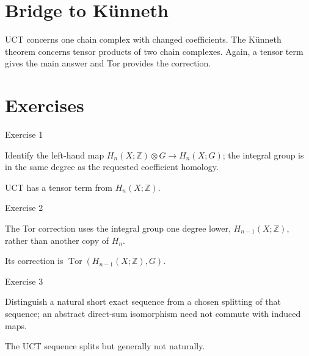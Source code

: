 \section{Bridge to Künneth}
UCT concerns one chain complex with changed coefficients.  The Künneth theorem
concerns tensor products of two chain complexes.  Again, a tensor term gives the
main answer and Tor provides the correction.


\section{Exercises}

\begin{exercise}\label{exr:viii26-01}
Exercise 1
\end{exercise}
\begin{hint}
Identify the left-hand map \(H_n(X;\mathbb Z)\otimes G\to H_n(X;G)\); the integral group is in the same degree as the requested coefficient homology.
\end{hint}
\begin{solution}
UCT has a tensor term from \(H_n(X;\mathbb Z)\).
\end{solution}

\begin{exercise}\label{exr:viii26-02}
Exercise 2
\end{exercise}
\begin{hint}
The Tor correction uses the integral group one degree lower, \(H_{n-1}(X;\mathbb Z)\), rather than another copy of \(H_n\).
\end{hint}
\begin{solution}
Its correction is \(\operatorname{Tor}(H_{n-1}(X;\mathbb Z),G)\).
\end{solution}

\begin{exercise}\label{exr:viii26-03}
Exercise 3
\end{exercise}
\begin{hint}
Distinguish a natural short exact sequence from a chosen splitting of that sequence; an abstract direct-sum isomorphism need not commute with induced maps.
\end{hint}
\begin{solution}
The UCT sequence splits but generally not naturally.
\end{solution}

